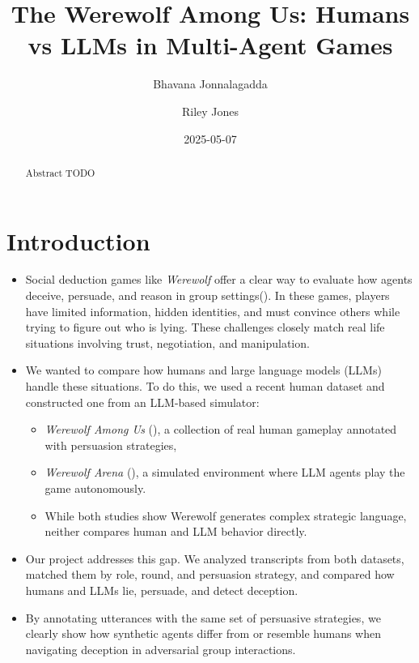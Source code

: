 \documentclass[
  letterpaper,
  DIV=11,
  numbers=noendperiod]{scrreprt}
\title{The Werewolf Among Us: Humans vs LLMs in Multi-Agent Games}
\author{Bhavana Jonnalagadda \and Riley Jones}
\date{2025-05-07}
\providecommand{\tightlist}{%
  \setlength{\itemsep}{0pt}\setlength{\parskip}{0pt}}
\renewcommand*\contentsname{Table of contents}
\newcommand\contentsname{Table of contents}
\begin{document}
\maketitle
\begin{abstract}
Abstract TODO
\end{abstract}

\renewcommand*\contentsname{Table of contents}
{
\hypersetup{linkcolor=}
\setcounter{tocdepth}{2}
\tableofcontents
}

\chapter{Introduction}\label{introduction}

\begin{itemize}
\item
  Social deduction games like \emph{Werewolf} offer a clear way to
  evaluate how agents deceive, persuade, and reason in group
  settings(). In
  these games, players have limited information, hidden identities, and
  must convince others while trying to figure out who is lying. These
  challenges closely match real life situations involving trust,
  negotiation, and manipulation.
\item
  We wanted to compare how humans and large language models (LLMs)
  handle these situations. To do this, we used a recent human dataset
  and constructed one from an LLM-based simulator:

  \begin{itemize}
  \tightlist
  \item
    \emph{Werewolf Among Us}
    (), a
    collection of real human gameplay annotated with persuasion
    strategies,
  \item
    \emph{Werewolf Arena}
    (), a simulated environment where LLM agents play the game
    autonomously.
  \item
    While both studies show Werewolf generates complex strategic
    language, neither compares human and LLM behavior directly.
  \end{itemize}
\item
  Our project addresses this gap. We analyzed transcripts from both
  datasets, matched them by role, round, and persuasion strategy, and
  compared how humans and LLMs lie, persuade, and detect deception.
\item
  By annotating utterances with the same set of persuasive strategies,
  we clearly show how synthetic agents differ from or resemble humans
  when navigating deception in adversarial group interactions.
\end{itemize}
\end{document}
